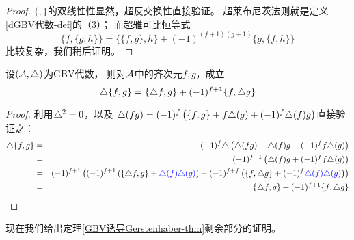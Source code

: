 
\begin{proof}
$\{,\}$的双线性性显然，超反交换性直接验证。
超莱布尼茨法则就是定义\ref{dGBV代数-def}的（3）；
而超雅可比恒等式
$$
  \{f,\{g,h\}\}=\{\{f,g\},h\}+(-1)^{(f+1)(g+1)}\{g,\{f,h\}\}
$$
比较复杂，我们稍后证明。
\end{proof}

\begin{lemma}\label{BV算子引理-lem}
设$(\mathcal{A},\triangle)$为GBV代数，
则对$\mathcal{A}$中的齐次元$f,g$，成立
$$\triangle\{f,g\}=\{\triangle f,g\}+(-1)^{f+1}\{f,\triangle g\}$$
\end{lemma}

\begin{proof}利用$\triangle^2=0$，以及
$\triangle(fg)=(-1)^f\left(\{f,g\}+f\triangle(g)+(-1)^f\triangle(f)g\right)$直接验证之：
\begin{eqnarray*}
     \triangle\{f,g\}
&=&
     (-1)^f\triangle
     \left(
       \triangle(fg)-\triangle(f)g-(-1)^ff\triangle(g)
     \right)\\
&=&
     (-1)^{f+1}
     \left(
       \triangle(f)g+(-1)^ff\triangle(g)
     \right)\\
&=&
     (-1)^{f+1}
     \left(
       (-1)^{f+1}
       \left(
         \{\triangle f,g\}+
         {\color{blue}
           \triangle(f)\triangle(g)
         }
       \right)
      +(-1)^{f+f}
       \left(
         \{f,\triangle g\}+(-1)^f
         {\color{blue}
           \triangle(f)\triangle(g)
         }
       \right)
     \right)\\
&=&
     \{\triangle f,g\}+(-1)^{f+1}\{f,\triangle g\}
\end{eqnarray*}
\end{proof}

现在我们给出定理\ref{GBV诱导Gerstenhaber-thm}剩余部分的证明。


